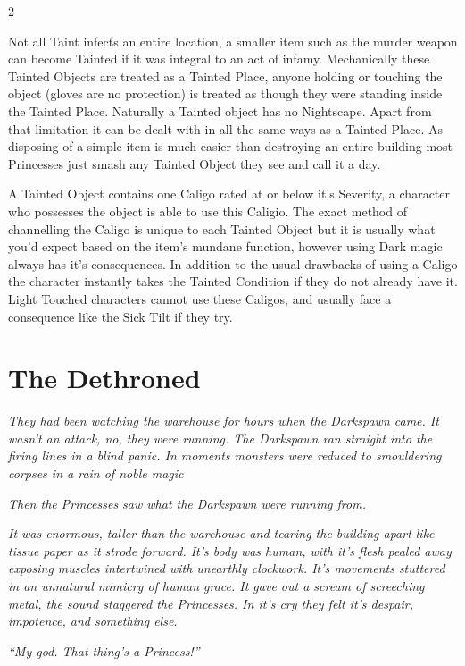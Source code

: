 \begin{multicols}{2}
\begin{mybox}
Not all Taint infects an entire location, a smaller item such as the murder weapon can become Tainted if it was integral to an act of infamy. Mechanically these Tainted Objects are treated as a Tainted Place, anyone holding or touching the object (gloves are no protection) is treated as though they were standing inside the Tainted Place. Naturally a Tainted object has no Nightscape. Apart from that limitation it can be dealt with in all the same ways as a Tainted Place. As disposing of a simple item is much easier than destroying an entire building most Princesses just smash any Tainted Object they see and call it a day. 

A Tainted Object contains one Caligo rated at or below it's Severity, a character who possesses the object is able to use this Caligio. The exact method of channelling the Caligo is unique to each Tainted Object but it is usually what you'd expect based on the item's mundane function, however using Dark magic always has it's consequences. In addition to the usual drawbacks of using a Caligo the character instantly takes the Tainted Condition if they do not already have it. Light Touched characters cannot use these Caligos, and usually face a consequence like the Sick Tilt if they try. 

\end{mybox}


\section*{The Dethroned}
\label{sec:Dethroned}


\textit{They had been watching the warehouse for hours when the Darkspawn came. It wasn't an attack, no, they were running. The Darkspawn ran straight into the firing lines in a blind panic. In moments monsters were reduced to smouldering corpses in a rain of noble magic}

\textit{Then the Princesses saw what the Darkspawn were running from.}

\textit{It was enormous, taller than the warehouse and tearing the building apart like tissue paper as it strode forward. It's body was human, with it's flesh pealed away exposing muscles intertwined with unearthly clockwork. It's movements stuttered in an unnatural mimicry of human grace. It gave out a scream of screeching metal, the sound staggered the Princesses. In it's cry they felt it's despair, impotence, and something else.} 

\textit{\textquotedblleft My god. That thing's a Princess!\textquotedblright}\\


\end{multicols}
